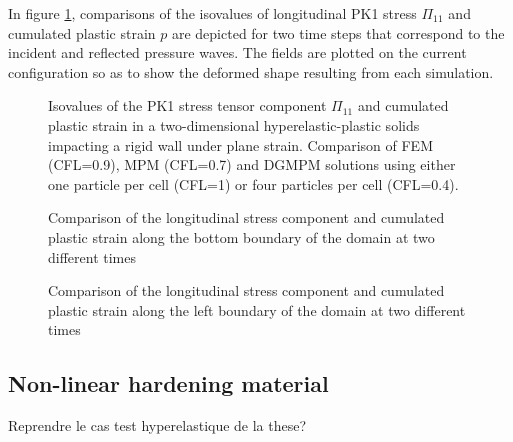 In figure \ref{fig:PS_taylor}, comparisons of the isovalues of longitudinal PK1 stress $\Pi_{11}$ and cumulated plastic strain $p$ are depicted for two time steps that correspond to the incident and reflected pressure waves.
The fields are plotted on the current configuration so as to show the deformed shape resulting from each simulation.


\begin{figure}[ht]
  \centering
  \caption{Isovalues of the PK1 stress tensor component $\Pi_{11}$ and cumulated plastic strain in a two-dimensional hyperelastic-plastic solids impacting a rigid wall under plane strain. Comparison of FEM (CFL=0.9), MPM (CFL=0.7) and DGMPM solutions using either one particle per cell (CFL=1) or four particles per cell (CFL=0.4).}
  \label{fig:PS_taylor}
\end{figure}


\begin{figure}[ht]
  \centering
  
  \caption{Comparison of the longitudinal stress component and cumulated plastic strain along the bottom boundary of the domain at two different times}
  \label{fig:bottom_line}
\end{figure}

\begin{figure}[ht]
  \centering
  
  \caption{Comparison of the longitudinal stress component and cumulated plastic strain along the left boundary of the domain at two different times}
  \label{fig:left_line}
\end{figure}

\subsection{Non-linear hardening material}
\label{sec:non-linear-hardening}
Reprendre le cas test hyperelastique de la these?


